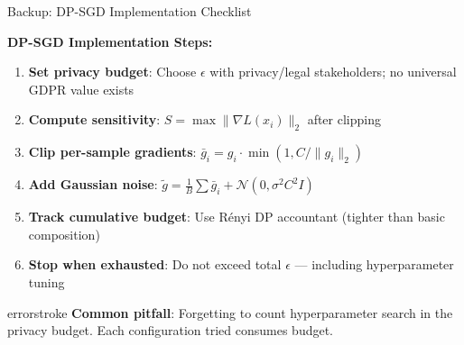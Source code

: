 \documentclass[aspectratio=169, 12pt]{beamer}
\begin{document}
\begin{frame}{Backup: DP-SGD Implementation Checklist}

\footnotesize
\textbf{DP-SGD Implementation Steps:}

\vspace{0.1cm}
\begin{enumerate}\setlength\itemsep{1pt}
  \item \textbf{Set privacy budget}: Choose $\epsilon$ with privacy/legal stakeholders; no universal GDPR value exists
  \item \textbf{Compute sensitivity}: $S = \max \|\nabla L(x_i)\|_2$ after clipping
  \item \textbf{Clip per-sample gradients}: $\bar{g}_i = g_i \cdot \min(1, C / \|g_i\|_2)$
  \item \textbf{Add Gaussian noise}: $\tilde{g} = \frac{1}{B}\sum \bar{g}_i + \mathcal{N}(0, \sigma^2 C^2 I)$
  \item \textbf{Track cumulative budget}: Use R\'enyi DP accountant (tighter than basic composition)
  \item \textbf{Stop when exhausted}: Do not exceed total $\epsilon$ --- including hyperparameter tuning
\end{enumerate}

\vspace{0.1cm}
\begin{mlsyscard}{errorstroke}
{\footnotesize \textbf{Common pitfall}: Forgetting to count hyperparameter search in the privacy budget. Each configuration tried consumes budget.}
\end{mlsyscard}

\end{frame}
\end{document}
